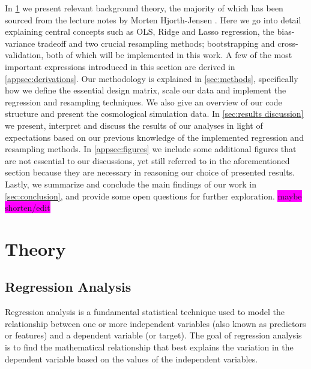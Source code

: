 \documentclass[aps,pra,english,notitlepage,reprint,nofootinbib]{revtex4-1}  %
\begin{document}
In \cref{sec:theory} we present relevant background theory, the majority of which has been sourced from the lecture notes by Morten Hjorth-Jensen \cite{notes}. Here we go into detail explaining central concepts such as OLS, Ridge and Lasso regression, the bias-variance tradeoff and two crucial resampling methods; bootstrapping and cross-validation, both of which will be implemented in this work. A few of the most important expressions introduced in this section are derived in \cref{appsec:derivations}. Our methodology is explained in \cref{sec:methods}, specifically how we define the essential design matrix, scale our data and implement the regression and resampling techniques. We also give an overview of our code structure and present the cosmological simulation data. In \cref{sec:results discussion} we present, interpret and discuss the results of our analyses in light of expectations based on our previous knowledge of the implemented regression and resampling methods. In \cref{appsec:figures} we include some additional figures that are not essential to our discussions, yet still referred to in the aforementioned section because they are necessary in reasoning our choice of presented results. Lastly, we summarize and conclude the main findings of our work in \cref{sec:conclusion}, and provide some open questions for further exploration. \colorbox{magenta}{maybe shorten/edit} 

\section{Theory}\label{sec:theory}
\subsection{Regression Analysis}
Regression analysis is a fundamental statistical technique used to model the relationship between one or more independent variables (also known as predictors or features) and a dependent variable (or target). The goal of regression analysis is to find the mathematical relationship that best explains the variation in the dependent variable based on the values of the independent variables.
\end{document}
